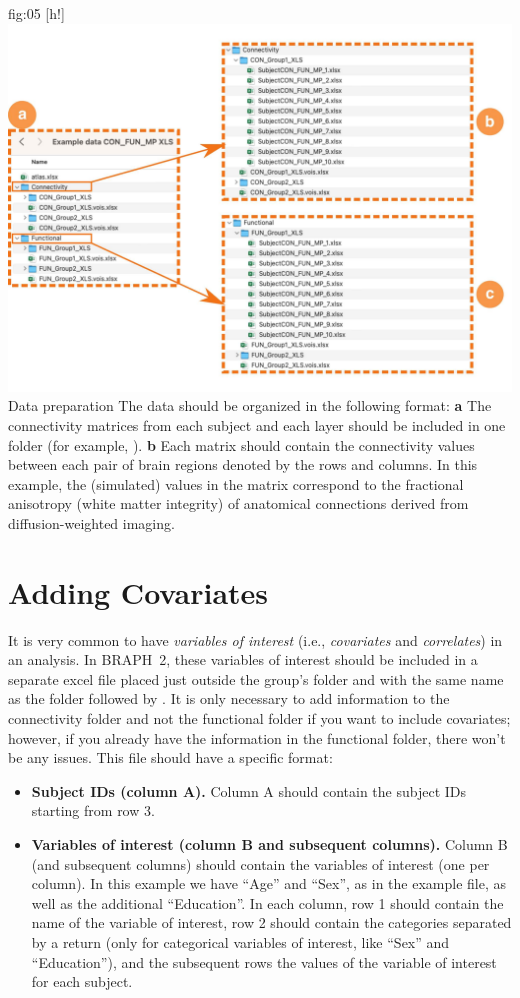 \documentclass[justified]{tufte-handout}
\begin{document}
	{fig:05}
	{
	[h!]
	\includegraphics{fig05.jpg}
	}
	{Data preparation}
	{
	The data should be organized in the following format:
	{\bf a} The connectivity matrices from each subject and each layer should be included in one folder (for example, ). 
	{\bf b} Each matrix should contain the connectivity values between each pair of brain regions denoted by the rows and columns. In this example, the (simulated) values in the matrix correspond to the fractional anisotropy (white matter integrity) of anatomical connections derived from diffusion-weighted imaging.
	} 


\section{Adding Covariates}
	
It is very common to have \emph{variables of interest} (i.e., \emph{covariates} and \emph{correlates}) in an analysis. In BRAPH~2, these variables of interest should be included in a separate excel file placed just outside the group's folder and with the same name as the folder followed by . It is only necessary to add information to the connectivity folder and not the functional folder if you want to include covariates; however, if you already have the information in the functional folder, there won’t be any issues.
This file should have a specific format:
\begin{itemize}

\item {\bf Subject IDs (column A).}
Column A should contain the subject IDs starting from row 3.

\item {\bf Variables of interest (column B and subsequent columns).}
Column B (and subsequent columns) should contain the variables of interest (one per column). 
In this example we have ``Age'' and ``Sex'', as in the example file, as well as the additional ``Education''.
In each column, row 1 should contain the name of the variable of interest, row 2 should contain the categories separated by a return (only for categorical variables of interest, like ``Sex'' and ``Education''), and the subsequent rows the values of the variable of interest for each subject.

\end{itemize}	
\end{document}
